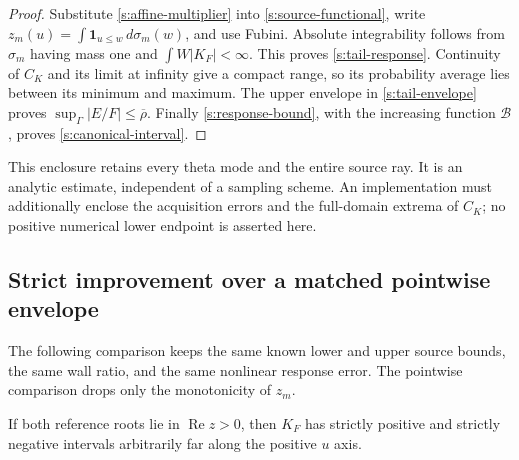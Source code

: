 \begin{proof}
Substitute \eqref{s:affine-multiplier} into
\eqref{s:source-functional}, write
$z_m(u)=\int\mathbf1_{u\le w}\,d\sigma_m(w)$, and use Fubini.
Absolute integrability follows from $\sigma_m$ having mass one and
$\int W|K_F|<\infty$.  This proves \eqref{s:tail-response}.
Continuity of $C_K$ and its limit at infinity give a compact range,
so its probability average lies between its minimum and maximum.
The upper envelope in \eqref{s:tail-envelope} proves
$\sup_\Gamma|E/F|\le\overline\rho$.  Finally
\eqref{s:response-bound}, with the increasing function
$\mathcal B$, proves \eqref{s:canonical-interval}.
\end{proof}

This enclosure retains every theta mode and the entire source ray.
It is an analytic estimate, independent of a sampling scheme.  An
implementation must additionally enclose the acquisition errors and
the full-domain extrema of $C_K$; no positive numerical lower endpoint
is asserted here.

\subsection{Strict improvement over a matched pointwise envelope}

The following comparison keeps the same known lower and upper source
bounds, the same wall ratio, and the same nonlinear response error.
The pointwise comparison drops only the monotonicity of $z_m$.

\begin{lemma}
\label{s:kernel-oscillation}
If both reference roots lie in $\operatorname{Re}z>0$, then $K_F$
has strictly positive and strictly negative intervals arbitrarily far
along the positive $u$ axis.
\end{lemma}

